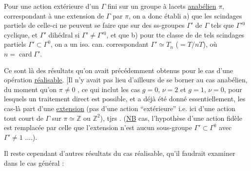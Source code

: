 Pour une action extérieure  d'un $\Gamma$ fini
sur un groupe à lacets \uline{anabélien} $\pi$, 
 correspondant à une extension  de $\Gamma$ par $\pi$,
on a donc établi a) que les scindages
partiels de celle-ci ne peuvent se faire
que sur des ss-groupes  $\Gamma'$ de $\Gamma$
tels que $\Gamma'{}^0$  cyclique, et $\Gamma'$ dihédral
si $\Gamma'\ne\Gamma'{}^0$, et que b) pour tte classe
de  de tels scindages partiels
 $\Gamma'\subset\Gamma^0$, on a un iso. can.
correspondant $\Gamma'\simeq T_n$ ($=T/nT$), où $n=\operatorname{card}\Gamma'$.

Ce sont là des résultats qu'on avait
précédemment obtenus pour le cas d'une
opération \uline{réalisable}. [Il n'y avait pas lieu
d'ailleurs de se borner au cas anabélien,
du moment qu'on  $\pi\ne0$ ,
ce qui inclut les cas  $g=0$, $\nu=2$ et
$g=1$, $\nu=0$, pour lesquels un traitement
direct est possible, et a déjà été donné
essentiellement, les cas-là  
part d'une \uline{extension} (pas d'une action
``extérieure'' i.e. ici d'une action tout court
de $\Gamma$ sur $\pi\simeq\mathbb Z$ ou $\mathbb Z^2$),  tjrs .
(\uline{NB}   cas, l'hypothèse d'une
action fidèle est remplacée par celle que
l'extension n'est    aucun
sous-groupe $\Gamma'\subset\Gamma^0$ avec $\Gamma'\ne1$ ....).

Il reste cependant d'autres résultats du
cas réalisable, qu'il faudrait examiner
dans le cas général :

